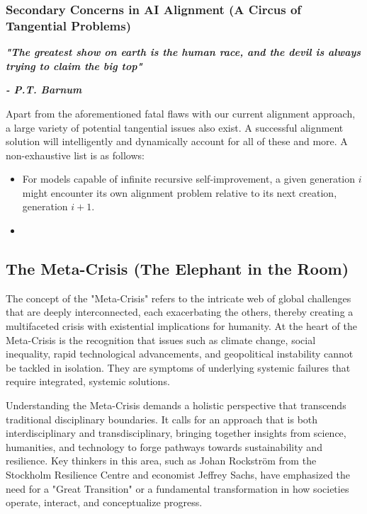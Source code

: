 \documentclass{article}
\begin{document}
\subsubsection{Secondary Concerns in AI Alignment (A Circus of Tangential Problems)}
\label{sec:SecondaryConcernsAIAlignment}


\noindent \begin{center}\begin{minipage}[t]{0.9\columnwidth}
    \textbf{\textit{"The greatest show on earth is the human race, and the devil is always trying to claim the big top"}}\par
    \textbf{\textit{- P.T. Barnum}}
\end{minipage}\end{center} 
\vspace{0.05in}

Apart from the aforementioned fatal flaws with our current alignment approach, a large variety of potential tangential issues also exist.
A successful alignment solution will intelligently and dynamically account for all of these and more.
A non-exhaustive list is as follows:\par

\begin{itemize}
    \item For models capable of infinite recursive self-improvement, a given generation $i$ might encounter its own alignment problem relative to its next creation, generation $i+1$.
    \item 
\end{itemize}




\subsection{The Meta-Crisis (The Elephant in the Room)}
\label{sec:MetaCrisis}

The concept of the "Meta-Crisis" refers to the intricate web of global challenges that are deeply interconnected, each exacerbating the others, thereby creating a multifaceted crisis with existential implications for humanity. At the heart of the Meta-Crisis is the recognition that issues such as climate change, social inequality, rapid technological advancements, and geopolitical instability cannot be tackled in isolation. They are symptoms of underlying systemic failures that require integrated, systemic solutions\cite{Rockstrom2009}.

Understanding the Meta-Crisis demands a holistic perspective that transcends traditional disciplinary boundaries. It calls for an approach that is both interdisciplinary and transdisciplinary, bringing together insights from science, humanities, and technology to forge pathways towards sustainability and resilience\cite{Sachs2015}. Key thinkers in this area, such as Johan Rockström from the Stockholm Resilience Centre and economist Jeffrey Sachs, have emphasized the need for a "Great Transition" or a fundamental transformation in how societies operate, interact, and conceptualize progress\cite{GreatTransition, UrgencyClimateAction}.
\end{document}
